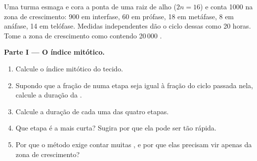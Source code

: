 \begin{problem}
\label{pb:g11:cell-cycle-mitosis:1}
Uma turma esmaga e cora a ponta de uma raiz de alho ($2n = 16$) e conta
1000  na zona de crescimento: 900 em interfase, 60 em prófase,
18 em metáfase, 8 em anáfase, 14 em telófase. Medidas independentes dão
o ciclo dessas  como 20 horas. Tome a zona de crescimento como
contendo 20\,000 .

\medskip
\noindent\textbf{Parte I --- O índice mitótico.}
\begin{enumerate}
  \item Calcule o índice mitótico do tecido.
  \item Supondo que a fração de  numa etapa seja igual à fração
        do ciclo passada nela, calcule a duração da .
  \item Calcule a duração de cada uma das quatro etapas.
  \item Que etapa é a mais curta? Sugira por que ela pode ser tão
        rápida.
  \item Por que o método exige contar muitas , e por que elas
        precisam vir apenas da zona de crescimento?
\end{enumerate}


\end{problem}
